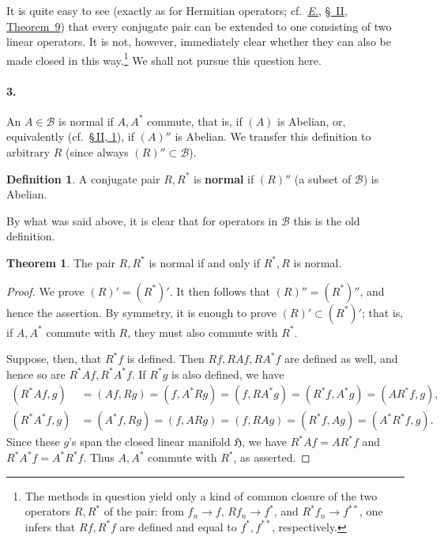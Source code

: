 \documentclass[
  paper=b5,
  twoside=true,
  fontsize=13pt,
  headings=normal,
  bookmarkpackage=false
]{scrartcl}
\theoremstyle{definition}
\newtheorem{theorem}{Theorem}
\newtheorem{definition}{Definition}
\newcommand{\Eref}{\hyperref[fn:E-paper]{\emph{E.}}}
\newcommand{\ErefText}[1]{\href{https://doi.org/10.1007/BF01782338}{#1}}
\begin{document}
It is quite easy to see (exactly as for Hermitian operators; cf.\
\Eref, \ErefText{\S~II, Theorem~9}) that every conjugate pair can be extended
to one consisting of two linear operators.  It is not, however,
immediately clear whether they can also be made closed in this
way.\footnote{\label{fn:61}The methods in question yield only a kind of common
closure of the two operators \(R,R^*\) of the pair: from
\(f_n\to f\), \(Rf_n\to f^*\), and \(R^*f_n\to f^{**}\), one infers
that \(Rf,R^*f\) are defined and equal to \(f^*,f^{**}\),
respectively.} We shall not pursue this question here.

\paragraph*{3.}\label{sec:iv-3}
An \(A\in\mathcal B\) is normal if \(A,A^*\) commute, that is, if
\((A)\) is Abelian, or, equivalently
(cf.\ \hyperref[sec:ring-and-commutant-1]{\S\,II, 1}), if
\((A)''\) is Abelian.  We transfer this definition to arbitrary \(R\)
(since always \((R)''\subset\mathcal B\)).

\begin{definition}\label{def:normal-conjugate-pair}
A conjugate pair \(R,R^*\) is \textbf{normal} if \((R)''\)
(a subset of \(\mathcal B\)) is Abelian.
\end{definition}

By what was said above, it is clear that for operators in
\(\mathcal B\) this is the old definition.

\begin{theorem}\label{thm:11}
The pair \(R,R^*\) is normal if and only if \(R^*,R\) is normal.
\end{theorem}

\begin{proof}
We prove \((R)'=(R^*)'\). It then follows that \((R)''=(R^*)''\),
and hence the assertion. By symmetry, it is enough
to prove \((R)'\subset(R^*)'\); that is, if \(A,A^*\) commute with
\(R\), they must also commute with \(R^*\).

Suppose, then, that \(R^*f\) is defined.  Then \(Rf,RAf,RA^*f\) are
defined as well, and hence so are \(R^*Af,R^*A^*f\).  If \(R^*g\) is
also defined, we have
\begin{align*}
  (R^*Af,g)&=(Af,Rg)=(f,A^*Rg)=(f,RA^*g)=(R^*f,A^*g)=(AR^*f,g),\\
  (R^*A^*f,g)&=(A^*f,Rg)=(f,ARg)=(f,RAg)=(R^*f,Ag)=(A^*R^*f,g).
\end{align*}
Since these \(g\)'s span the closed linear manifold \(\mathfrak H\),
we have \(R^*Af=AR^*f\) and \(R^*A^*f=A^*R^*f\). Thus \(A,A^*\) commute with \(R^*\), as asserted.
\end{proof}
\end{document}
